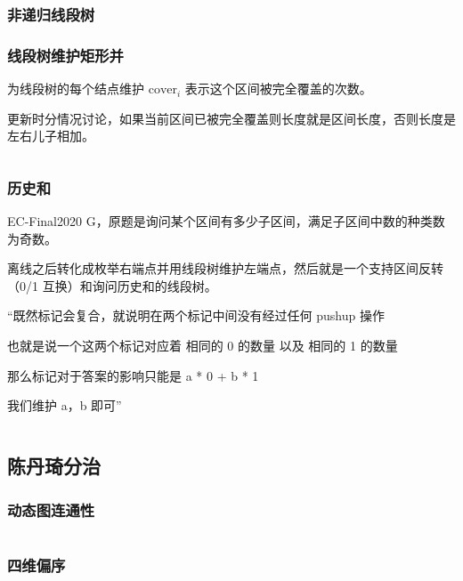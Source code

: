 \documentclass[a4paper, twoside]{article}
\begin{document}
\begin{multicols}{2}
				\subsubsection{非递归线段树}
					
				
				\subsubsection{线段树维护矩形并}
					为线段树的每个结点维护 $\text{cover}_i$ 表示这个区间被完全覆盖的次数。

					更新时分情况讨论，如果当前区间已被完全覆盖则长度就是区间长度，否则长度是左右儿子相加。
					\inputminted{cpp}{../src/datastructure/线段树维护矩形并.cpp}
				
				\subsubsection{历史和}

					EC-Final2020 G，原题是询问某个区间有多少子区间，满足子区间中数的种类数为奇数。

					离线之后转化成枚举右端点并用线段树维护左端点，然后就是一个支持区间反转（0/1 互换）和询问历史和的线段树。

					``既然标记会复合，就说明在两个标记中间没有经过任何 pushup 操作

					也就是说一个这两个标记对应着 相同的 0 的数量 以及 相同的 1 的数量

					那么标记对于答案的影响只能是 a * 0 + b * 1

					我们维护 a，b 即可''

					\inputminted{cpp}{../src/datastructure/ec20g.cpp}

					
	
			\subsection{陈丹琦分治}
				\subsubsection[动态图连通性（分治并查集）]{动态图连通性}
					\inputminted{cpp}{../src/datastructure/分治并查集.cpp}

				\subsubsection{四维偏序}
					\inputminted{cpp}{../src/datastructure/CDQ分治.cpp}
	

\end{multicols}
\end{document}
